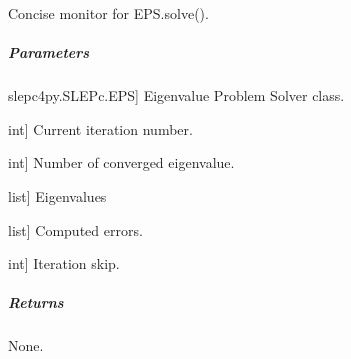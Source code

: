 \documentclass[letterpaper,10pt,english]{sphinxmanual}
\begin{document}
\begin{fulllineitems}
\label{\detokenize{scrimp.utils:scrimp.utils.linalg.monitor_EPS_short}}
\pysigstartsignatures
\pysiglinewithargsret
{}
{\sphinxparamcomma {}\sphinxparamcomma {}\sphinxparamcomma {}\sphinxparamcomma {}\sphinxparamcomma {}}
{}
\pysigstopsignatures
\sphinxAtStartPar
Concise monitor for EPS.solve().


\subparagraph{Parameters}
\label{\detokenize{scrimp.utils:parameters}}\begin{description}
\sphinxlineitem{eps}{[}slepc4py.SLEPc.EPS{]}
\sphinxAtStartPar
Eigenvalue Problem Solver class.

\sphinxlineitem{it}{[}int{]}
\sphinxAtStartPar
Current iteration number.

\sphinxlineitem{nconv}{[}int{]}
\sphinxAtStartPar
Number of converged eigenvalue.

\sphinxlineitem{eig}{[}list{]}
\sphinxAtStartPar
Eigenvalues

\sphinxlineitem{err}{[}list{]}
\sphinxAtStartPar
Computed errors.

\sphinxlineitem{it\_skip}{[}int{]}
\sphinxAtStartPar
Iteration skip.

\end{description}


\subparagraph{Returns}
\label{\detokenize{scrimp.utils:returns}}
\sphinxAtStartPar
None.

\end{fulllineitems}

\end{document}
